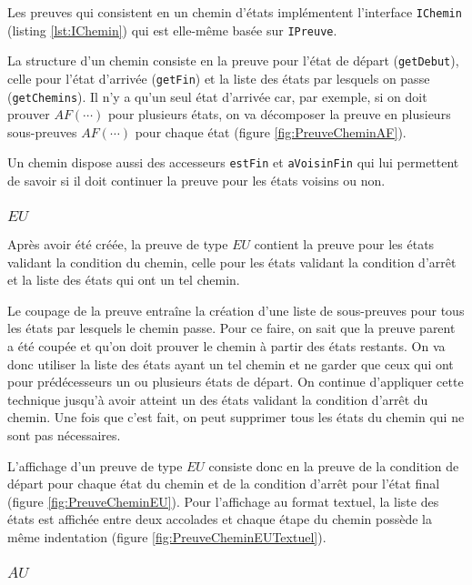 \documentclass[dvipsnames]{report}
\begin{document}
Les preuves qui consistent en un chemin d'états implémentent l'interface \texttt{IChemin} (listing \ref{lst:IChemin}) qui est elle-même basée sur \texttt{IPreuve}.

La structure d'un chemin consiste en la preuve pour l'état de départ (\texttt{getDebut}), celle pour l'état d'arrivée (\texttt{getFin}) et la liste des états par lesquels on passe (\texttt{getChemins}). Il n'y a qu'un seul état d'arrivée car, par exemple, si on doit prouver $AF(\cdots)$ pour plusieurs états, on va décomposer la preuve en plusieurs sous-preuves $AF(\cdots)$ pour chaque état (figure \ref{fig:PreuveCheminAF}).



Un chemin dispose aussi des accesseurs \texttt{estFin} et \texttt{aVoisinFin} qui lui permettent de savoir si il doit continuer la preuve pour les états voisins ou non.

\subsubsection{$EU$}

Après avoir été créée, la preuve de type $EU$ contient la preuve pour les états validant la condition du chemin, celle pour les états validant la condition d'arrêt et la liste des états qui ont un tel chemin.

Le coupage de la preuve entraîne la création d'une liste de sous-preuves pour tous les états par lesquels le chemin passe. Pour ce faire, on sait que la preuve parent a été coupée et qu'on doit prouver le chemin à partir des états restants. On va donc utiliser la liste des états ayant un tel chemin et ne garder que ceux qui ont pour prédécesseurs un ou plusieurs états de départ. On continue d'appliquer cette technique jusqu'à avoir atteint un des états validant la condition d'arrêt du chemin. Une fois que c'est fait, on peut supprimer tous les états du chemin qui ne sont pas nécessaires.

L'affichage d'un preuve de type $EU$ consiste donc en la preuve de la condition de départ pour chaque état du chemin et de la condition d'arrêt pour l'état final (figure \ref{fig:PreuveCheminEU}). Pour l'affichage au format textuel, la liste des états est affichée entre deux accolades et chaque étape du chemin possède la même indentation (figure \ref{fig:PreuveCheminEUTextuel}).



\subsubsection{$AU$}
\end{document}
